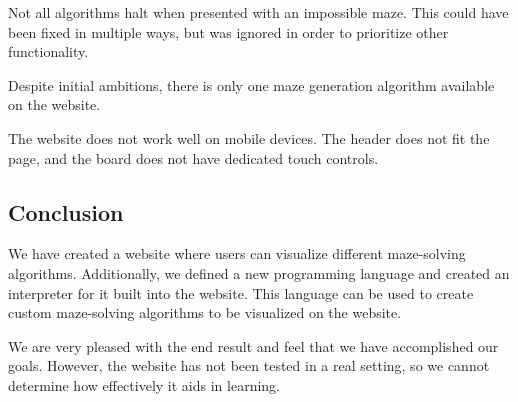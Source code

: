 Not all algorithms halt when presented with an impossible maze. This could have been fixed in multiple ways, but was ignored in order to prioritize other functionality.

Despite initial ambitions, there is only one maze generation algorithm available on the website.

The website does not work well on mobile devices. The header does not fit the page, and the board does not have dedicated touch controls.

\subsection{Conclusion}

We have created a website where users can visualize different maze-solving algorithms. Additionally, we defined a new programming language and created an interpreter for it built into the website. This language can be used to create custom maze-solving algorithms to be visualized on the website.

We are very pleased with the end result and feel that we have accomplished our goals. However, the website has not been tested in a real setting, so we cannot determine how effectively it aids in learning.
